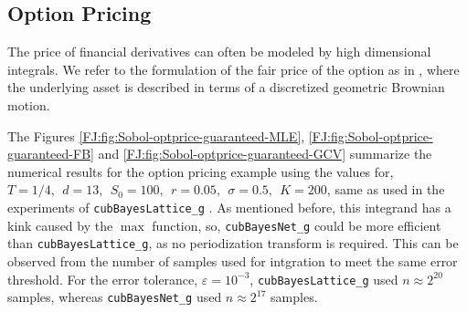 \documentclass[graybox,footinfo]{svmult}
\begin{document}
\subsection{Option Pricing}

The price of financial derivatives can often be modeled by high dimensional integrals. 
We refer to the formulation of the fair price of the option as in \cite{RatHic19a}, where the underlying asset is described in terms of a discretized geometric Brownian motion.

The Figures \ref{FJ:fig:Sobol-optprice-guaranteed-MLE}, \ref{FJ:fig:Sobol-optprice-guaranteed-FB} and 
\ref{FJ:fig:Sobol-optprice-guaranteed-GCV} summarize the numerical results for the option pricing example using the values for,
$
T = 1/4, \ \ d = 13, \ \ S_0 = 100, \ \ r =  0.05, \ \ \sigma = 0.5, \ \ K = 200
$, same as used in the experiments of \texttt{cubBayesLattice\_g} \cite{RatHic19a}.
As mentioned before, this integrand has a kink caused by the $\max$ function, so, \texttt{cubBayesNet\_g} could be more efficient than \texttt{cubBayesLattice\_g}, as no periodization transform is required. This can be observed from the number of samples used for intgration to meet the same error threshold. For the error tolerance, $\varepsilon=10^{-3}$,  \texttt{cubBayesLattice\_g} used $n \approx 2^{20}$ samples, whereas \texttt{cubBayesNet\_g} used $n \approx 2^{17}$ samples.
\end{document}

